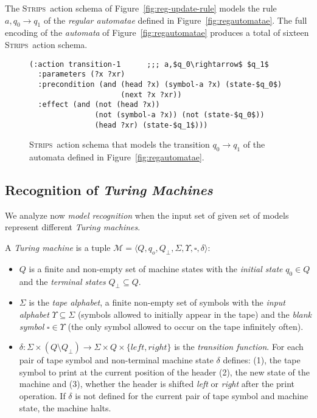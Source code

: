 \documentclass[letterpaper]{article} %
\newcommand{\tup}[1]{{\langle #1 \rangle}}
\newcommand{\strips}{\textsc{Strips}}     %
\begin{document}
The \strips\ action schema of Figure~\ref{fig:reg-update-rule} models the rule $a,q_0\rightarrow q_1$ of the {\em regular automatae} defined in Figure~\ref{fig:regautomatae}. The full encoding of the {\em automata} of Figure~\ref{fig:regautomatae} produces a total of sixteen \strips\ action schema.

\begin{figure}
\begin{scriptsize}
\begin{lstlisting}
(:action transition-1      ;;; a,$q_0\rightarrow$ $q_1$
  :parameters (?x ?xr)
  :precondition (and (head ?x) (symbol-a ?x) (state-$q_0$)
                     (next ?x ?xr))
  :effect (and (not (head ?x)) 
               (not (symbol-a ?x)) (not (state-$q_0$))
               (head ?xr) (state-$q_1$)))
\end{lstlisting}
\end{scriptsize}
 \caption{\small \strips\ action schema that models the transition $q_0\rightarrow q_1$ of the automata defined in Figure~\ref{fig:regautomatae}.}
\label{fig:regupdate-rule}
\end{figure}



\subsection{Recognition of {\em Turing Machines}}
We analyze now {\em model recognition} when the input set of given set of models represent different {\em Turing machines}.

A {\em Turing machine} is a tuple $\mathcal{M}=\tup{Q,q_o,Q_{\bot},\Sigma,\Upsilon,\square,\delta}$:
\begin{itemize}
\item $Q$ is a finite and non-empty set of machine states with the {\em initial state} $q_0\in Q$ and the {\em terminal states} $Q_{\bot}\subseteq Q$.  
\item $\Sigma$ is the {\em tape alphabet}, a finite non-empty set of symbols with the {\em input alphabet} $\Upsilon\subseteq\Sigma$ (symbols allowed to initially appear in the tape) and the {\em blank symbol} $\square\in\Upsilon$ (the only symbol allowed to occur on the tape infinitely often).
\item $\delta: \Sigma\times (Q\setminus Q_{\bot}) \rightarrow \Sigma\times Q\times\{left,right\}$ is the {\em transition function}. For each pair of tape symbol and non-terminal machine state $\delta$ defines: (1), the tape symbol to print at the current position of the header (2), the new state of the machine and (3), whether the header is shifted {\em left} or {\em right} after the print operation. If $\delta$ is not defined for the current pair of tape symbol and machine state, the machine halts.
\end{itemize}
\end{document}

